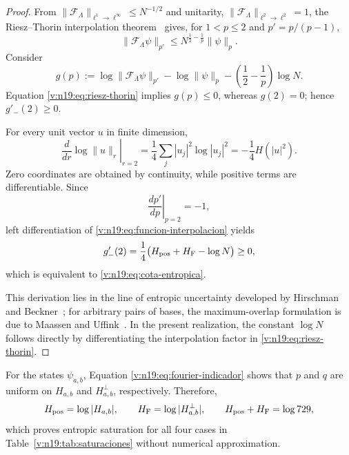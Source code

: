 \begin{proof}
From \(\|\mathcal F_\Lambda\|_{\ell^1\to\ell^\infty}
\le N^{-1/2}\) and unitarity,
\(\|\mathcal F_\Lambda\|_{\ell^2\to\ell^2}=1\), the Riesz--Thorin
interpolation theorem~\cite{riesz_1927,thorin_1948} gives, for
\(1<p\le2\) and \(p'=p/(p-1)\),
\begin{equation}
 \|\mathcal F_\Lambda\psi\|_{p'}
 \le N^{\frac12-\frac1p}\|\psi\|_p.
 \label{v:n19:eq:riesz-thorin}
\end{equation}
Consider
\begin{equation}
 g(p):=\log\|\mathcal F_\Lambda\psi\|_{p'}
       -\log\|\psi\|_p
       -\left(\frac12-\frac1p\right)\log N.
 \label{v:n19:eq:funcion-interpolacion}
\end{equation}
Equation \eqref{v:n19:eq:riesz-thorin} implies \(g(p)\le0\), whereas
\(g(2)=0\); hence \(g'_-(2)\ge0\).

For every unit vector \(u\) in finite dimension,
\begin{equation}
 \left.\frac{d}{dr}\log\|u\|_r\right|_{r=2}
 =\frac14\sum_j|u_j|^2\log|u_j|^2
 =-\frac14H(|u|^2).
 \label{v:n19:eq:derivada-norma}
\end{equation}
Zero coordinates are obtained by continuity, while positive terms are
differentiable. Since
\[
 \left.\frac{dp'}{dp}\right|_{p=2}=-1,
\]
left
differentiation of \eqref{v:n19:eq:funcion-interpolacion} yields
\begin{equation}
 g'_-(2)=\frac14
 \bigl(H_{\rm pos}+H_{\rm F}-\log N\bigr)\ge0,
 \label{v:n19:eq:derivada-entropica}
\end{equation}
which is equivalent to \eqref{v:n19:eq:cota-entropica}.

This derivation lies in the line of entropic uncertainty developed by
Hirschman and Beckner~\cite{hirschman_1957,beckner_1975}; for arbitrary
pairs of bases, the maximum-overlap formulation is due to
Maassen and Uffink~\cite{maassen_uffink_1988}. In the present realization,
the constant \(\log N\) follows directly by differentiating the
interpolation factor in \eqref{v:n19:eq:riesz-thorin}.
\end{proof}

For the states \(\psi_{a,b}\), Equation
\eqref{v:n19:eq:fourier-indicador} shows that \(p\) and \(q\) are uniform
on \(H_{a,b}\) and \(H_{a,b}^{\perp}\), respectively. Therefore,
\[
 H_{\rm pos}=\log|H_{a,b}|,\qquad
 H_{\rm F}=\log|H_{a,b}^{\perp}|,\qquad
 H_{\rm pos}+H_{\rm F}=\log729,
\]
which proves entropic saturation for all four cases in
Table~\ref{v:n19:tab:saturaciones} without numerical approximation.

